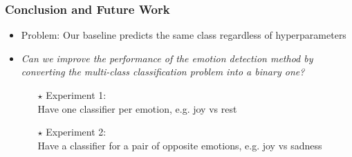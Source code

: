 \documentclass[aspectratio=169]{beamer}
\begin{document}
\begin{frame}
\frametitle{Conclusion and Future Work}

\begin{itemize}
\item Problem: Our baseline predicts the same class regardless of hyperparameters
\setlength\itemsep{0.4em}
\item \emph{Can we improve the performance of the emotion detection method by converting the multi-class classification problem into a binary one? }
\begin{itemize}
\item [$\star$] Experiment 1:\\ Have one classifier per emotion, e.g. joy vs rest
\item [$\star$] Experiment 2:\\ Have a classifier for a pair of opposite emotions, e.g. joy vs sadness
\end{itemize}


\end{itemize}

%

\end{frame}
\end{document}
